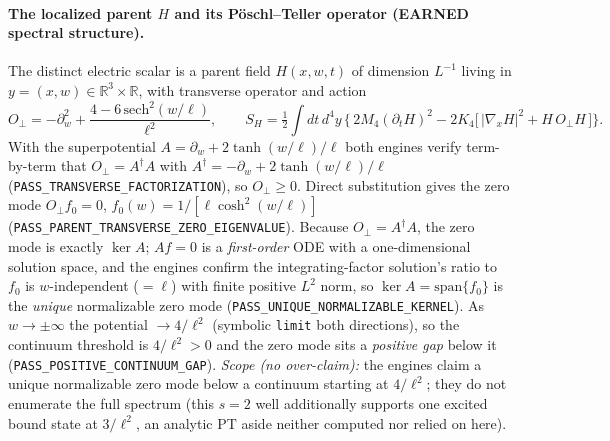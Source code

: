 \paragraph{The localized parent \(H\) and its P\"oschl--Teller operator (EARNED spectral structure).}
The distinct electric scalar is a parent field \(H(x,w,t)\) of dimension
\(L^{-1}\) living in \(y=(x,w)\in\mathbb{R}^3\times\mathbb{R}\), with transverse
operator and action
\[
  O_\perp=-\partial_w^2+\frac{4-6\,\mathrm{sech}^2(w/\ell)}{\ell^2},\qquad
  S_H=\tfrac12\!\int\! dt\,d^4y\,\bigl\{\,2M_4(\partial_t H)^2
     -2K_4\bigl[\,|\nabla_x H|^2+H\,O_\perp H\,\bigr]\bigr\}.
\]
With the superpotential \(A=\partial_w+2\tanh(w/\ell)/\ell\) both engines verify
term-by-term that \(O_\perp=A^\dagger A\) with \(A^\dagger=-\partial_w+2\tanh(w/\ell)/\ell\)
(\texttt{PASS\_TRANSVERSE\_FACTORIZATION}), so \(O_\perp\ge0\). Direct
substitution gives the zero mode \(O_\perp f_0=0\), \(f_0(w)=1/[\ell\cosh^2(w/\ell)]\)
(\texttt{PASS\_PARENT\_TRANSVERSE\_ZERO\_EIGENVALUE}). Because \(O_\perp=A^\dagger A\),
the zero mode is exactly \(\ker A\); \(Af=0\) is a \emph{first-order} ODE with a
one-dimensional solution space, and the engines confirm the integrating-factor
solution's ratio to \(f_0\) is \(w\)-independent (\(=\ell\)) with finite positive
\(L^2\) norm, so \(\ker A=\mathrm{span}\{f_0\}\) is the \emph{unique}
normalizable zero mode (\texttt{PASS\_UNIQUE\_NORMALIZABLE\_KERNEL}). As
\(w\to\pm\infty\) the potential \(\to 4/\ell^2\) (symbolic \texttt{limit} both
directions), so the continuum threshold is \(4/\ell^2>0\) and the zero mode sits
a \emph{positive gap} below it (\texttt{PASS\_POSITIVE\_CONTINUUM\_GAP}).
\emph{Scope (no over-claim):} the engines claim a unique normalizable zero mode
below a continuum starting at \(4/\ell^2\); they do not enumerate the full
spectrum (this \(s=2\) well additionally supports one excited bound state at
\(3/\ell^2\), an analytic PT aside neither computed nor relied on here).

